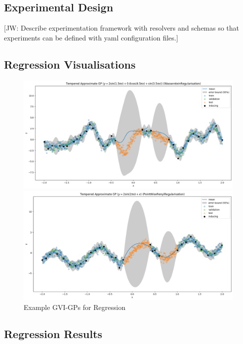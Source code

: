 \documentclass{article}
\newcommand{\jw}[1]{{\color{gray} [JW: #1]}}
\numberwithin{equation}{section}
\begin{document}
\subsection{Experimental Design}
\jw{Describe experimentation framework with resolvers and schemas so that experiments can be defined with yaml configuration files.}
\subsection{Regression Visualisations}
\begin{figure}[h!]
\centering
\begin{minipage}{.5\textwidth}
  \centering
  \includegraphics[width=0.9\linewidth]{experiments/regression/toy_curves/outputs/curve3/tempered-WassersteinRegularisation.png}
\end{minipage}%
\begin{minipage}{.5\textwidth}
  \centering
  \includegraphics[width=0.9\linewidth]{experiments/regression/toy_curves/outputs/curve4/tempered-PointWiseRenyiRegularisation.png}
\end{minipage}
\caption{Example GVI-GPs for Regression}
\end{figure}
\subsection{Regression Results}
\end{document}

